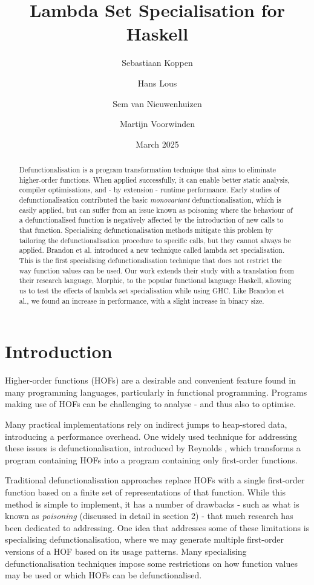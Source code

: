 \documentclass[a4paper,UKenglish,cleveref, autoref, thm-restate]{template/lipics-v2021}
\title{Lambda Set Specialisation for Haskell}
\author{Sebastiaan Koppen}{Utrecht University, Netherlands}{}{}{}
\author{Hans Lous}{Utrecht University, Netherlands}{}{}{}
\author{Sem van Nieuwenhuizen}{Utrecht University, Netherlands}{}{}{}
\author{Martijn Voorwinden}{Utrecht University, Netherlands}{}{}{}
\date{March 2025}
\newcommand{\hof}{HOF\xspace}
\newcommand{\hofs}{HOFs\xspace}
\newcommand{\ghc}{GHC\xspace}
\begin{document}
\maketitle

\begin{abstract}
  Defunctionalisation is a program transformation technique that aims to eliminate higher-order functions. When applied successfully, it can enable better static analysis, compiler optimisations, and - by extension - runtime performance. Early studies of defunctionalisation contributed the basic \textit{monovariant} defunctionalisation, which is easily applied, but can suffer from an issue known as poisoning where the behaviour of a defunctionalised function is negatively affected by the introduction of new calls to that function. Specialising defunctionalisation methods mitigate this problem by tailoring the defunctionalisation procedure to specific calls, but they cannot always be applied. Brandon et al. introduced a new technique called lambda set specialisation. This is the first specialising defunctionalisation technique that does not restrict the way function values can be used. Our work extends their study with a translation from their research language, Morphic, to the popular functional language Haskell, allowing us to test the effects of lambda set specialisation while using \ghc. Like Brandon et al., we found an increase in performance, with a slight increase in binary size.
\end{abstract}

\section{Introduction}
Higher-order functions (\hofs) are a desirable and convenient feature found in many programming languages, particularly in functional programming. Programs making use of \hofs can be challenging to analyse - and thus also to optimise.

Many practical implementations rely on indirect jumps to heap-stored data, introducing a performance overhead. One widely used technique for addressing these issues is defunctionalisation, introduced by Reynolds \cite{reynolds1972definitional}, which transforms a program containing \hofs into a program containing only first-order functions.

Traditional defunctionalisation approaches replace \hofs with a single first-order function based on a finite set of representations of that function. While this method is simple to implement, it has a number of drawbacks - such as what is known as \textit{poisoning} \cite{wansbrough1999once}  (discussed in detail in section 2) - that much research has been dedicated to addressing. One idea that addresses some of these limitations is specialising defunctionalisation, where we may generate multiple first-order versions of a \hof based on its usage patterns. Many specialising defunctionalisation techniques impose some restrictions on how function values may be used or which \hofs can be defunctionalised.
\end{document}
